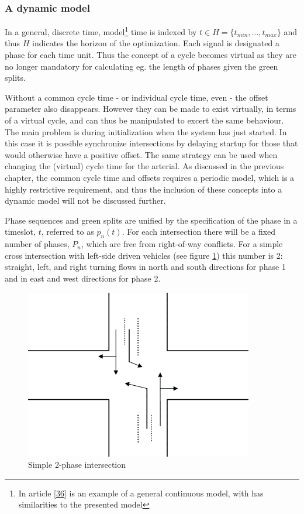 \subsubsection*{A dynamic model}
\label{dynamicmodel}
In a general, discrete time, model\footnote{In article \ref{36} is an example of a general continuous model, with has similarities to the presented model} time is indexed by $t \in H = \lbrace t_{min},...,t_{max} \rbrace$ and thus $H$ indicates the horizon of the optimization. Each signal is designated a phase for each time unit. Thus the concept of a cycle becomes virtual as they are no longer mandatory for calculating eg. the length of phases given the green splits.

Without a common cycle time - or individual cycle time, even - the offset parameter also disappears. However they can be made to exist virtually, in terms of a virtual cycle, and can thus be manipulated to excert the same behaviour. 
The main problem is during initialization when the system has just started. In this case it is possible synchronize intersections by delaying startup for those that would otherwise have a positive offset. The same strategy can be used when changing the (virtual) cycle time for the arterial. As discussed in the previous chapter, the common cycle time and offsets requires a periodic model, which is a highly restrictive requirement, and thus the inclusion of these concepts into a dynamic model will not be discussed further.

Phase sequences and green splits are unified by the specification of the phase in a timeslot, $t$, referred to as $p_n(t)$. For each intersection there will be a fixed number of phases, $P_n$, which are free from right-of-way conflicts. For a simple cross intersection with left-side driven vehicles (see figure \ref{fig:simple_intersection}) this number is 2: straight, left, and right turning flows in north and south directions for phase 1 and in east and west directions for phase 2.

\begin{figure}[!ht]
\begin{center}
\includegraphics[scale=0.4]{simple_intersection.png} 
\end{center}
\caption{Simple 2-phase intersection}
\label{fig:simple_intersection}
\end{figure}

